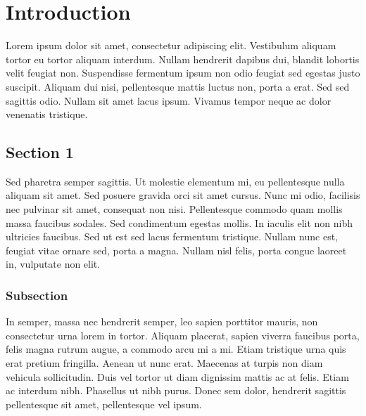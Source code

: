 \section{Introduction}
Lorem ipsum dolor sit amet, consectetur adipiscing elit. Vestibulum aliquam
tortor eu tortor aliquam interdum. Nullam hendrerit dapibus dui, blandit
lobortis velit feugiat non. Suspendisse fermentum ipsum non odio feugiat sed
egestas justo suscipit. Aliquam dui nisi, pellentesque mattis luctus non, porta
a erat. Sed sed sagittis odio. Nullam sit amet lacus ipsum. Vivamus tempor
neque ac dolor venenatis tristique.

\subsection{Section 1}
Sed pharetra semper sagittis. Ut molestie elementum mi, eu pellentesque nulla
aliquam sit amet. Sed posuere gravida orci sit amet cursus. Nunc mi odio,
facilisis nec pulvinar sit amet, consequat non nisi. Pellentesque commodo quam
mollis massa faucibus sodales. Sed condimentum egestas mollis. In iaculis elit
non nibh ultricies faucibus. Sed ut est sed lacus fermentum tristique. Nullam
nunc est, feugiat vitae ornare sed, porta a magna. Nullam nisl felis, porta
congue laoreet in, vulputate non elit.

\subsubsection{Subsection}
In semper, massa nec hendrerit semper, leo sapien porttitor mauris, non
consectetur urna lorem in tortor. Aliquam placerat, sapien viverra faucibus
porta, felis magna rutrum augue, a commodo arcu mi a mi. Etiam tristique urna
quis erat pretium fringilla. Aenean ut nunc erat. Maecenas at turpis non diam
vehicula sollicitudin. Duis vel tortor ut diam dignissim mattis ac at felis.
Etiam ac interdum nibh. Phasellus ut nibh purus. Donec sem dolor, hendrerit
sagittis pellentesque sit amet, pellentesque vel ipsum.


